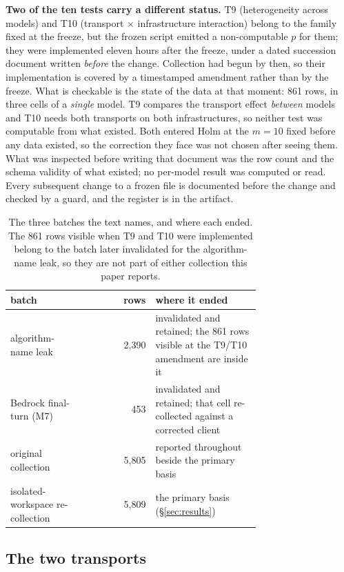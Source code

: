 \textbf{Two of the ten tests carry a different status.} T9 (heterogeneity across models) and T10 (transport $\times$ infrastructure
interaction) belong to the family fixed at the freeze, but the frozen script emitted a non-computable $p$
for them; they were implemented eleven hours after the freeze, under a dated succession document written
\emph{before} the change. Collection had begun by then, so their implementation is covered by a
timestamped amendment rather than by the freeze. What is checkable is the state of the data at that
moment: 861 rows, in three cells of a \emph{single} model. T9 compares the transport effect \emph{between}
models and T10 needs both transports on both infrastructures, so neither test was computable from what
existed. Both entered Holm at the $m=10$ fixed
before any data existed, so the correction they face was not chosen after seeing them. What was inspected before writing that document was the row count and the schema validity of
what existed; no per-model result was computed or read. Every subsequent change to a frozen file is
documented before the change and checked by a guard, and the register is in the artifact.

\begin{table}[h]
\caption{The three batches the text names, and where each ended. The 861 rows visible when T9 and T10 were
implemented belong to the batch later invalidated for the algorithm-name leak, so they are not part of
either collection this paper reports.}
\label{tab:lotti}
\centering
\small
\begin{tabular}{@{}P{0.30\linewidth}rP{0.42\linewidth}@{}}
\toprule
batch & rows & where it ended \\
\midrule
algorithm-name leak & 2{,}390 & invalidated and retained; the 861 rows visible at the T9/T10 amendment are inside it \\
Bedrock final-turn (M7) & 453 & invalidated and retained; that cell re-collected against a corrected client \\
original collection & 5{,}805 & reported throughout beside the primary basis \\
isolated-workspace re-collection & 5{,}809 & the primary basis (\S\ref{sec:results}) \\
\bottomrule
\end{tabular}
\end{table}

\subsection{The two transports}

